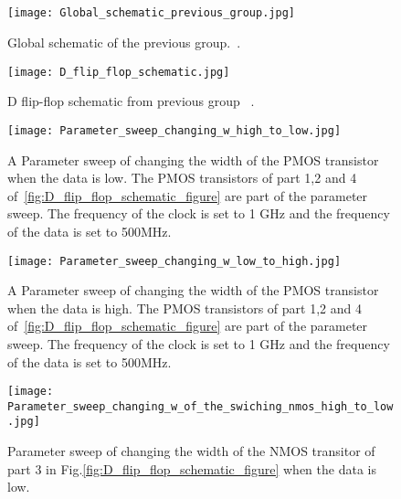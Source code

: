 \begin{appendices}
\section{}\label{sec:appendix}

\begin{figure}[h]
\texttt{[image: Global\_schematic\_previous\_group.jpg]}
\caption{Global schematic of the previous group.~\cite{powerdac}.}
\label{fig:Global_schematic_previous_group_figure}
\end{figure}

\begin{figure}[h]
 \texttt{[image: D\_flip\_flop\_schematic.jpg]}
 \caption{ D flip-flop schematic from previous group ~\cite{powerdac}.}
 \label{fig:D_flip_flop_ previous_group_figure}
\end{figure}

\begin{figure}[h]
 \texttt{[image: Parameter\_sweep\_changing\_w\_high\_to\_low.jpg]}
 \caption{A Parameter sweep of changing the width of the PMOS transistor when the data is low. The PMOS transistors of part 1,2 and 4 of~\ref{fig:D_flip_flop_schematic_figure} are part of the parameter sweep. The frequency of the clock is set to 1 GHz and the frequency of the data is set to 500MHz.} 
 \label{fig:parametersweep_changing_w_high_to_low_figure}
\end{figure}

\begin{figure}[h]
 \texttt{[image: Parameter\_sweep\_changing\_w\_low\_to\_high.jpg]}
 \caption{A Parameter sweep of changing the width of the PMOS transistor when the data is high. The PMOS transistors of part 1,2 and 4 of~\ref{fig:D_flip_flop_schematic_figure} are part of the parameter sweep. The frequency of the clock is set to 1 GHz and the frequency of the data is set to 500MHz.}
 \label{fig:parametersweep_changing_w_low_to_high_figure}
\end{figure}

\begin{figure}[h]
 \texttt{[image: Parameter\_sweep\_changing\_w\_of\_the\_swiching\_nmos\_high\_to\_low.jpg]}
 \caption{Parameter sweep of changing the width of the NMOS transitor of part 3 in Fig.\ref{fig:D_flip_flop_schematic_figure} when the data is low.}
 \label{fig:Parameter_sweep_changing_w_of_the_swiching_nmos_high_to_low_figure}
\end{figure}


\end{appendices}
